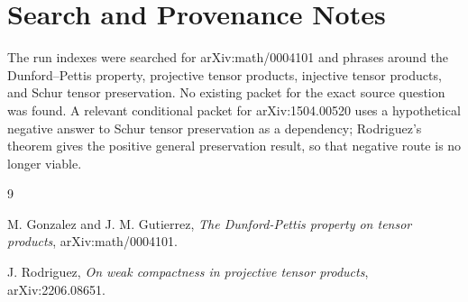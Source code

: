 \documentclass[11pt]{amsart}
\begin{document}
\section*{Search and Provenance Notes}

The run indexes were searched for arXiv:math/0004101 and phrases around the
Dunford--Pettis property, projective tensor products, injective tensor
products, and Schur tensor preservation. No existing packet for the exact
source question was found. A relevant conditional packet for arXiv:1504.00520
uses a hypothetical negative answer to Schur tensor preservation as a
dependency; Rodriguez's theorem gives the positive general preservation
result, so that negative route is no longer viable.

\begin{thebibliography}{9}

M. Gonzalez and J. M. Gutierrez,
\emph{The Dunford-Pettis property on tensor products},
arXiv:math/0004101.

J. Rodriguez,
\emph{On weak compactness in projective tensor products},
arXiv:2206.08651.

\end{thebibliography}
\end{document}
